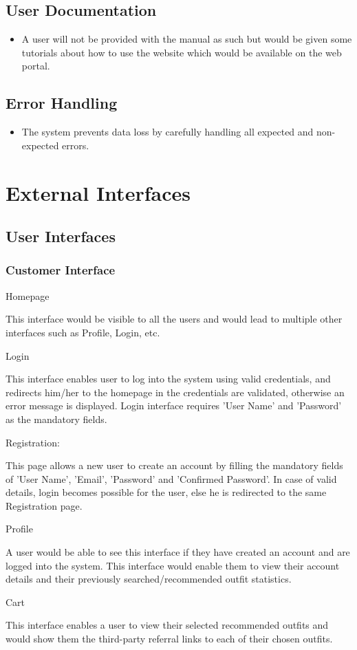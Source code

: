\subsection{User Documentation}
\begin{itemize}
    \item A user will not be provided with the manual as such but would be given some tutorials about how to use the website which would be available on the web portal. 
\end{itemize}

\subsection{Error Handling}
\begin{itemize}
    \item The system prevents data loss by carefully handling all expected and non-expected errors. 
\end{itemize}

\section{External Interfaces}

\subsection{User Interfaces}

\subsubsection{Customer Interface}

\begin{outline}
  \1 Homepage
  
  This interface would be visible to all the users and would lead to multiple other interfaces such as Profile, Login, etc. 
  
  \1 Login
  
  This interface enables user to log into the system using valid credentials, and redirects him/her to the homepage in the credentials are validated, otherwise an error message is displayed. Login interface requires 'User Name' and 'Password' as the mandatory fields. 
  
  \1 Registration:
  
  This page allows a new user to create an account by filling the mandatory fields of 'User Name', 'Email', 'Password' and 'Confirmed Password'. In case of valid details, login becomes possible for the user, else he is redirected to the same Registration page.
  
  \1 Profile
  
  A user would be able to see this interface if they have created an account and are logged into the system. This interface would enable them to view their account details and their previously searched/recommended outfit statistics.
  
  \1 Cart
  
  This interface enables a user to view their selected recommended outfits and would show them the third-party referral links to each of their chosen outfits. 
  
 \end{outline}
